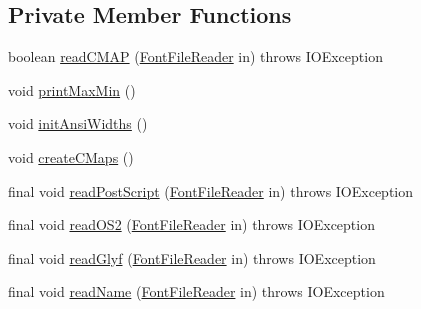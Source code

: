\subsection*{Private Member Functions}
\begin{DoxyCompactItemize}
\item 
boolean \mbox{\hyperlink{classorg_1_1newdawn_1_1slick_1_1tools_1_1hiero_1_1truetype_1_1_t_t_f_file_a9204ab43cc587cc5469fe72bca74f4c0}{read\+C\+M\+AP}} (\mbox{\hyperlink{classorg_1_1newdawn_1_1slick_1_1tools_1_1hiero_1_1truetype_1_1_font_file_reader}{Font\+File\+Reader}} in)  throws I\+O\+Exception 
\item 
void \mbox{\hyperlink{classorg_1_1newdawn_1_1slick_1_1tools_1_1hiero_1_1truetype_1_1_t_t_f_file_a08d673cae8b55d634dff85cb0c283c3d}{print\+Max\+Min}} ()
\item 
void \mbox{\hyperlink{classorg_1_1newdawn_1_1slick_1_1tools_1_1hiero_1_1truetype_1_1_t_t_f_file_ad2aea81f9cd840b635f622ea5350da1e}{init\+Ansi\+Widths}} ()
\item 
void \mbox{\hyperlink{classorg_1_1newdawn_1_1slick_1_1tools_1_1hiero_1_1truetype_1_1_t_t_f_file_a46ab09656217dead7e00e6bfc6ace9c9}{create\+C\+Maps}} ()
\item 
final void \mbox{\hyperlink{classorg_1_1newdawn_1_1slick_1_1tools_1_1hiero_1_1truetype_1_1_t_t_f_file_a38db8c15f9f3ef80c0af00108a18286a}{read\+Post\+Script}} (\mbox{\hyperlink{classorg_1_1newdawn_1_1slick_1_1tools_1_1hiero_1_1truetype_1_1_font_file_reader}{Font\+File\+Reader}} in)  throws I\+O\+Exception 
\item 
final void \mbox{\hyperlink{classorg_1_1newdawn_1_1slick_1_1tools_1_1hiero_1_1truetype_1_1_t_t_f_file_a1000d9fbc611404c5adef5b87a7063d7}{read\+O\+S2}} (\mbox{\hyperlink{classorg_1_1newdawn_1_1slick_1_1tools_1_1hiero_1_1truetype_1_1_font_file_reader}{Font\+File\+Reader}} in)  throws I\+O\+Exception 
\item 
final void \mbox{\hyperlink{classorg_1_1newdawn_1_1slick_1_1tools_1_1hiero_1_1truetype_1_1_t_t_f_file_a367b0fcef8c000789316006b7aa7cdf2}{read\+Glyf}} (\mbox{\hyperlink{classorg_1_1newdawn_1_1slick_1_1tools_1_1hiero_1_1truetype_1_1_font_file_reader}{Font\+File\+Reader}} in)  throws I\+O\+Exception 
\item 
final void \mbox{\hyperlink{classorg_1_1newdawn_1_1slick_1_1tools_1_1hiero_1_1truetype_1_1_t_t_f_file_a64b676636833c77afa694867a0377713}{read\+Name}} (\mbox{\hyperlink{classorg_1_1newdawn_1_1slick_1_1tools_1_1hiero_1_1truetype_1_1_font_file_reader}{Font\+File\+Reader}} in)  throws I\+O\+Exception 

\end{DoxyCompactItemize}
